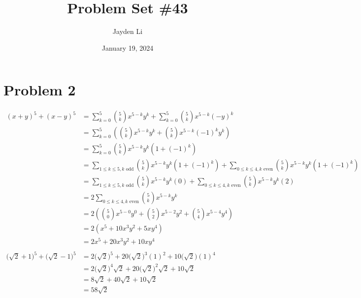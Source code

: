 \documentclass{article}
\title{Problem Set \#43}
\author{Jayden Li}
\date{January 19, 2024}
\begin{document}

\fontsize{12pt}{12pt}\selectfont

\maketitle

\section*{Problem 2}
\begin{align*}
	(x+y)^5+(x-y)^5&=\sum_{k=0}^{5}\binom{5}{k}x^{5-k}y^k+
		\sum_{k=0}^{5}\binom{5}{k}x^{5-k}(-y)^k \\
	&=\sum_{k=0}^{5}\left(\binom{5}{k}x^{5-k}y^k+
		\binom{5}{k}x^{5-k}(-1)^ky^k\right) \\
	&=\sum_{k=0}^{5}\binom{5}{k}x^{5-k}y^k\left(1+(-1)^k\right) \\
	&=\sum_{1\leq k\leq5,k\text{ odd}}\binom{5}{k}x^{5-k}y^k\left(
		1+(-1)^k\right)+\sum_{0\leq k\leq4,k\text{ even}}
		\binom{5}{k}x^{5-k}y^k\left(1+(-1)^k\right) \\
	&=\sum_{1\leq k\leq5,k\text{ odd}}\binom{5}{k}x^{5-k}y^k(0)+
		\sum_{0\leq k\leq4,k\text{ even}}\binom{5}{k}x^{5-k}y^k(2) \\
	&=2\sum_{0\leq k\leq4,k\text{ even}}\binom{5}{k}x^{5-k}y^k \\
	&=2\left(\binom{5}{0}x^{5-0}y^0+\binom{5}{2}x^{5-2}y^2+
		\binom{5}{4}x^{5-4}y^4\right) \\
	&=2\left(x^5+10x^3y^2+5xy^4\right) \\
	&=2x^5+20x^3y^2+10xy^4 \\
	\\
	\bigl(\sqrt{2}+1\bigr)^5+\bigl(\sqrt{2}-1\bigr)^5
	&=2\bigl(\sqrt{2}\bigr)^5+20\bigl(\sqrt{2}\bigr)^3(1)^2+
		10\bigl(\sqrt{2}\bigr)(1)^4 \\
	&=2\bigl(\sqrt{2}\bigr)^4\sqrt{2}+20\bigl(\sqrt{2}\bigr)^2
		\sqrt{2}+10\sqrt{2} \\
	&=8\sqrt{2}+40\sqrt{2}+10\sqrt{2} \\
	&=\boxed{58\sqrt{2}}
\end{align*}
\end{document}
